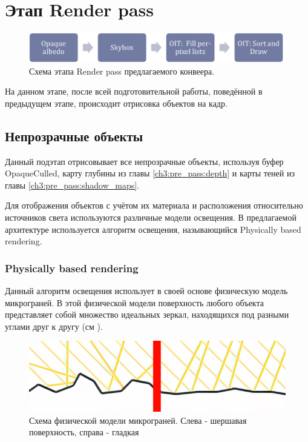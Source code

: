 \section{Этап Render pass} \label{ch3:render_pass}
	\begin{figure}[ht!] 
		\center
		\includegraphics [scale=0.4] {my_folder/images//renderpass_schema}	
		\caption{Схема этапа Render pass предлагаемого конвеера.} 
		\label{fig:renderpass_schema}
	\end{figure}
	
	На данном этапе, после всей подготовительной работы, поведённой в предыдущем этапе, происходит отрисовка объектов на кадр.
	
	\subsection{Непрозрачные объекты} \label{ch3:render_pass:opaque}
		Данный подэтап отрисовывает все непрозрачные объекты, используя буфер OpaqueCulled, карту глубины из главы \ref{ch3:pre_pass:depth} и карты теней из главы \ref{ch3:pre_pass:shadow_maps}.
		
		Для отображения объектов с учётом их материала и расположения относительно источников света используются различные модели освещения. В предлагаемой архитектуре используется алгоритм освещения, называющийся Physically based rendering.
	
		\subsubsection{Physically based rendering} \label{ch3:render_pass:opaque:pbr}
			Данный алгоритм освещения использует в своей основе физическую модель микрограней. В этой физической модели поверхность любого объекта представляет собой множество идеальных зеркал, находящихся под разными углами друг к другу (см ).
			
			\begin{figure}[ht!] 
				\center
				\includegraphics [scale=0.4] {my_folder/images//microfacet}	
				\caption{Схема физической модели микрограней. Слева - шершавая поверхность, справа - гладкая} 
				\label{fig:microfacet}
			\end{figure}
			
